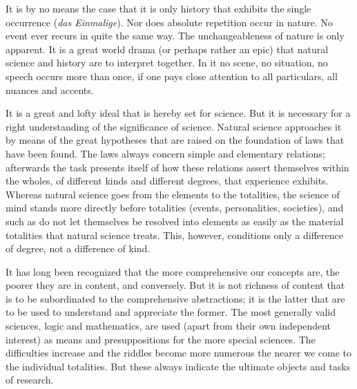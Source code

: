 \documentclass[12pt]{article}
\newcommand{\opage}[1]{\marginnote{\footnotesize\textit{[#1]}}}
\begin{document}
It is by no means the case that it is only history that exhibits the single
occurrence (\textit{das Einmalige}). Nor does absolute repetition occur in
nature. No event ever recurs in quite the same way. The
\opage{22}%
unchangeableness of nature is only apparent. It is a great world drama (or
perhaps rather an epic) that natural science and history are to interpret
together. In it no scene, no situation, no speech occurs more than once, if one
pays close attention to all particulars, all nuances and accents.

It is a great and lofty ideal that is hereby set for science. But it is
necessary for a right understanding of the significance of science. Natural
science approaches it by means of the great hypotheses that are raised on the
foundation of laws that have been found. The laws always concern simple and
elementary relations; afterwards the task presents itself of how these
relations assert themselves within the wholes, of different kinds and different
degrees, that experience exhibits. Whereas natural science goes from the
elements to the totalities, the science of mind stands more directly before
totalities (events, personalities, societies), and such as do not let
themselves be resolved into elements as easily as the material totalities that
natural science treats. This, however, conditions only a difference of degree,
not a difference of kind.

\opage{23}%
It has long been recognized that the more comprehensive our concepts are, the
poorer they are in content, and conversely. But it is not richness of content
that is to be subordinated to the comprehensive abstractions; it is the latter
that are to be used to understand and appreciate the former. The most generally
valid sciences, logic and mathematics, are used (apart from their own
independent interest) as means and presuppositions for the more special
sciences. The difficulties increase and the riddles become more numerous the
nearer we come to the individual totalities. But these always indicate the
ultimate objects and tasks of research.
\end{document}
